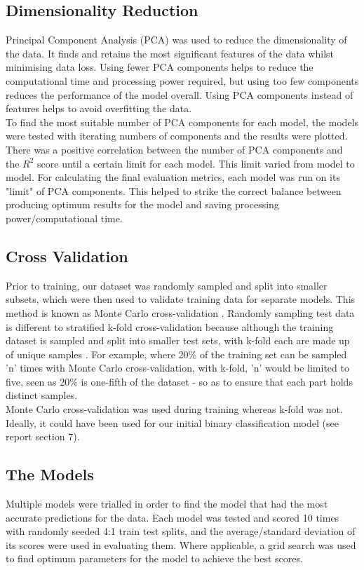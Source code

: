 \documentclass[11pt, titlepage]{article}
\begin{document}
\subsection{Dimensionality Reduction}
Principal Component Analysis (PCA) was used to reduce the dimensionality of the data. It finds and retains the most significant features of the data whilst minimising data loss. Using fewer PCA components helps to reduce the computational time and processing power required, but using too few components reduces the performance of the model overall. Using PCA components instead of features helps to avoid overfitting the data\cite{pca}.\\

To find the most suitable number of PCA components for each model, the models were tested with iterating numbers of components and the results were plotted. There was a positive correlation between the number of PCA components and the $R^{2}$ score until a certain limit for each model. This limit varied from model to model. For calculating the final evaluation metrics, each model was run on its "limit" of PCA components. This helped to strike the correct balance between producing optimum results for the model and saving processing power/computational time.

\subsection{Cross Validation}
Prior to training, our dataset was randomly sampled and split into smaller subsets, which were then used to validate training data for separate models. This method is known as Monte Carlo cross-validation \cite{montecarlo}. Randomly sampling test data is different to stratified k-fold cross-validation because although the training dataset is sampled and split into smaller test sets, with k-fold each are made up of unique samples \cite{kfold}. For example, where 20\% of the training set can be sampled 'n' times with Monte Carlo cross-validation, with k-fold, 'n' would be limited to five, seen as 20\% is one-fifth of the dataset - so as to ensure that each part holds distinct samples. \\

Monte Carlo cross-validation was used during training whereas k-fold was not. Ideally, it could have been used for our initial binary classification model (see report section 7). 

\subsection{The Models}
Multiple models were trialled in order to find the model that had the most accurate predictions for the data. Each model was tested and scored 10 times with randomly seeded 4:1 train test splits, and the average/standard deviation of its scores were used in evaluating them. Where applicable, a grid search was used to find optimum parameters for the model to achieve the best scores.
\end{document}
